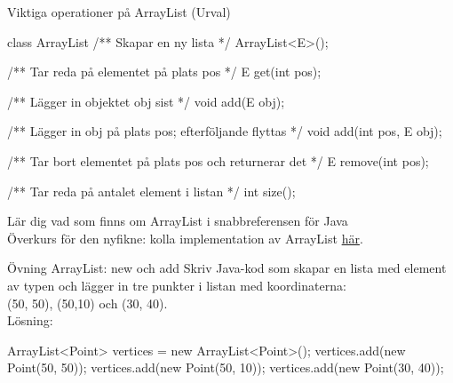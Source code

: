\begin{Slide}{Viktiga operationer på ArrayList (Urval)}
\begin{JavaSpec}{class ArrayList}
/** Skapar en ny lista */
ArrayList<E>();

/** Tar reda på elementet på plats pos */
E get(int pos);

/** Lägger in objektet obj sist */
void add(E obj);

/** Lägger in obj på plats pos; efterföljande flyttas */
void add(int pos, E obj);

/** Tar bort elementet på plats pos och returnerar det */
E remove(int pos);

/** Tar reda på antalet element i listan */
int size();
\end{JavaSpec}
Lär dig vad som finns om ArrayList i snabbreferensen för Java\\
\SlideFontSmall Överkurs för den nyfikne: kolla implementation av ArrayList \href{http://www.docjar.com/html/api/java/util/ArrayList.java.html}{här}.
\end{Slide}


\begin{Slide}{Övning ArrayList: new och add}
Skriv Java-kod som skapar en lista med element av typen  och lägger in tre punkter i listan med koordinaterna:\\ (50, 50), (50,10) och (30, 40).
\pause
\\\vspace{1em} Lösning: \\\vspace{1em} 
\begin{Code}[numberstyle=,language=Java]
ArrayList<Point> vertices = new ArrayList<Point>(); 
vertices.add(new Point(50, 50));
vertices.add(new Point(50, 10)); 
vertices.add(new Point(30, 40)); 
\end{Code}
\end{Slide}


